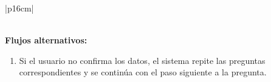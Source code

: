 \begin{longtable}{|p{16cm}|}
\begin{minipage}[t]{\linewidth}
        \end{minipage} \\ \hline
        \textbf{Flujos alternativos:} \\
        \begin{minipage}[t]{\linewidth}
            \begin{enumerate}
                \item[11.a] Si el usuario no confirma los datos, el sistema repite las preguntas correspondientes y se continúa con el paso siguiente a la pregunta.
            \end{enumerate}
            \vspace{1mm}
        \end{minipage}\\ \hline
        \caption{Descripción general del caso de uso - Solicitud del certificado de empadronamiento.}
        \end{longtable}
        

